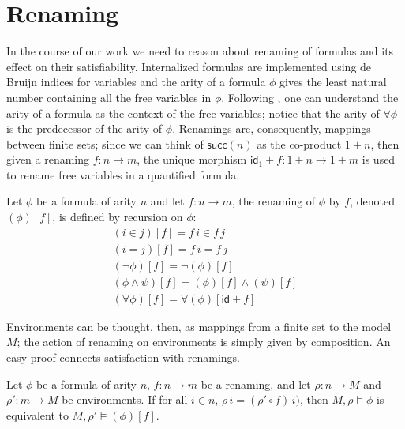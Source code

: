 \section{Renaming}
\newcommand{\renaming}[2]{(#1)[#2]}
\newcommand{\inFm}[2]{#1 \in #2}
\newcommand{\eqFm}[2]{#1 = #2}
\newcommand{\negFm}[1]{\neg #1}
\newcommand{\andFm}[2]{#1 \wedge #2}
\newcommand{\forallFm}[1]{\forall #1}

\newcommand{\inIFm}[2]{\mathsf{Member}(#1,#2)}
\newcommand{\eqIFm}[2]{\mathsf{Equal}(#1,#2)}
\newcommand{\nandIFm}[2]{\mathsf{Nand}(#1,#2)}
\newcommand{\forallIFm}[1]{\mathsf{Forall(#1)}}


In the course of our work we need to reason about renaming of formulas
and its effect on their satisfiability. Internalized formulas are
implemented using de Bruijn indices for variables and the arity of a
formula $\phi$ gives the least natural number containing all the free
variables in $\phi$. Following \citet{fiore-abssyn}, one can
understand the arity of a formula as the context of the free
variables; notice that the arity of $\forallFm{\phi}$ is the
predecessor of the arity of $\phi$. Renamings are, consequently,
mappings between finite sets; since we can think of $\mathsf{succ}(n)$
as the co-product $1+n$, then given a renaming $f \colon n \to m$, the
unique morphism $\mathsf{id}_1+f \colon 1+n \to 1+m$ is used to rename
free variables in a quantified formula.

\begin{definition}[Renaming]
  Let $\phi$ be a formula of arity $n$ and let $f \colon n \to m$, the
  renaming of $\phi$ by $f$, denoted $\renaming{\phi}{f}$, is defined
  by recursion on $\phi$:
  \begin{gather*}
    \renaming{\inFm{i}{j}}{f} = \inFm{f\,i}{f\,j}\\
    \renaming{\eqFm{i}{j}}{f} = \eqFm{f\,i}{f\,j}\\
    \renaming{\negFm{\phi}}{f} = \negFm{\renaming{\phi}{f}}\\
    \renaming{\andFm{\phi}{\psi}}{f} = \andFm{\renaming{\phi}{f}}{\renaming{\psi}{f}}\\
    \renaming{\forallFm{\phi}}{f} = \forallFm{\renaming{\phi}{\mathsf{id}+f}}
  \end{gather*}
\end{definition}

Environments can be thought, then, as mappings from a finite set to
the model $M$; the action of renaming on environments is simply given
by composition. An easy proof connects satisfaction with renamings.
\begin{lemma}
  \label{lem:renaming}
  Let $\phi$ be a formula of arity $n$, $f \colon n \to m$ be a
  renaming, and let $\rho \colon n \to M$ and $\rho' \colon m \to M$
  be environments. If for all $i \in n$,
  $\rho\,i = (\rho' \circ f)\,i)$, then $M,\rho\models \phi$ is
  equivalent to $M,\rho' \models \renaming{\phi}{f}$.
\end{lemma}

